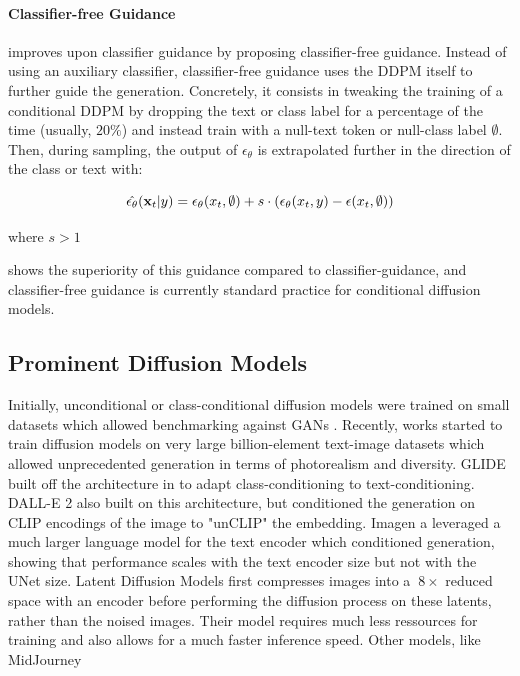 \paragraph{Classifier-free Guidance}
\cite{ho2022classifierfree} improves upon classifier guidance by 
proposing classifier-free guidance. Instead of using an auxiliary classifier, 
classifier-free guidance uses the \ac{DDPM} itself to further guide the 
generation. Concretely, it consists in tweaking the training of a conditional \ac{DDPM} 
by dropping the text or class label for a percentage of the time (usually, $20\%$)
and instead train with a null-text token or null-class label $\emptyset$. Then, during 
sampling, the output of $\epsilon_\theta$ is extrapolated further in the direction 
of the class or text with:

\begin{equation}
      \hat{\epsilon_\theta}(\mathbf{x}_t|y) = \epsilon_\theta(x_t, \emptyset) + s \cdot (\epsilon_\theta(x_t, y) - \epsilon(x_t, \emptyset))
\end{equation}

\noindent where $s > 1$

\cite{nichol2021glide} shows the superiority of this guidance compared to classifier-guidance,
and classifier-free guidance is currently standard practice for conditional diffusion models.

\subsection{Prominent Diffusion Models}

Initially, unconditional or class-conditional diffusion models were trained on small 
datasets which allowed benchmarking against \ac{GAN}s \cite{ho2020denoising, dhariwal2021diffusion}.
Recently, works started to train diffusion models on very large billion-element text-image 
datasets \citep{schuhmann2022laion} which allowed unprecedented generation  in terms of 
photorealism and diversity. GLIDE \citep{nichol2021glide} built off the architecture in 
\cite{dhariwal2021diffusion} to adapt class-conditioning to text-conditioning. DALL-E 2 \citep{ramesh2022hierarchical}
also built on this architecture, but conditioned the generation on  CLIP \cite{radford2021learning}
encodings of the image to "unCLIP" the embedding. Imagen \citep{saharia2022photorealistic} a leveraged 
a much larger language model for the text encoder which conditioned generation, showing that 
performance scales with the text encoder size but not with the UNet size. Latent Diffusion Models \citep{rombach2022high}
first compresses images into a $~8\times$ reduced space with an encoder before performing the 
diffusion process on these latents, rather than the noised images. Their model requires much 
less ressources for training and also allows for a much faster inference speed. Other models, 
like MidJourney



